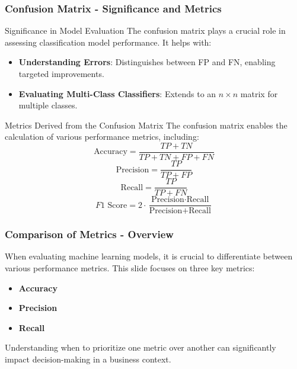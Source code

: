 \documentclass[aspectratio=169]{beamer}
\begin{document}
\begin{frame}[fragile]
    \frametitle{Confusion Matrix - Significance and Metrics}
    \begin{block}{Significance in Model Evaluation}
        The confusion matrix plays a crucial role in assessing classification model performance. It helps with:
        \begin{itemize}
            \item \textbf{Understanding Errors}: Distinguishes between FP and FN, enabling targeted improvements.
            \item \textbf{Evaluating Multi-Class Classifiers}: Extends to an \(n \times n\) matrix for multiple classes.
        \end{itemize}
    \end{block}
    
    \begin{block}{Metrics Derived from the Confusion Matrix}
        The confusion matrix enables the calculation of various performance metrics, including:
        \begin{equation}
            \text{Accuracy} = \frac{TP + TN}{TP + TN + FP + FN}
        \end{equation}
        \begin{equation}
            \text{Precision} = \frac{TP}{TP + FP}
        \end{equation}
        \begin{equation}
            \text{Recall} = \frac{TP}{TP + FN}
        \end{equation}
        \begin{equation}
            F1 \text{ Score} = 2 \cdot \frac{\text{Precision} \cdot \text{Recall}}{\text{Precision} + \text{Recall}}
        \end{equation}
    \end{block}
\end{frame}

\begin{frame}[fragile]
    \frametitle{Comparison of Metrics - Overview}
    When evaluating machine learning models, it is crucial to differentiate between various performance metrics. This slide focuses on three key metrics: 
    \begin{itemize}
        \item \textbf{Accuracy}
        \item \textbf{Precision}
        \item \textbf{Recall}
    \end{itemize}
    Understanding when to prioritize one metric over another can significantly impact decision-making in a business context.
\end{frame}
\end{document}
